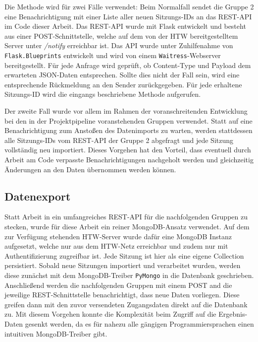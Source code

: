 Die Methode wird für zwei Fälle verwendet: 
Beim Normalfall sendet die Gruppe 2 eine Benachrichtigung mit einer Liste aller neuen Sitzungs-IDs an das REST-API im Code dieser Arbeit. 
Das REST-API wurde mit Flask entwickelt und besteht aus einer POST-Schnittstelle, welche auf dem von der HTW bereitgestelltem Server unter \textit{/notify} erreichbar ist. 
Das API wurde unter Zuhilfenahme von \texttt{Flask.Blueprints} entwickelt und wird von einem \texttt{Waitress}-Webserver bereitgestellt. 
Für jede Anfrage wird geprüft, ob Content-Type und Payload dem erwarteten JSON-Daten entsprechen. 
Sollte dies nicht der Fall sein, wird eine entsprechende Rückmeldung an den Sender zurückgegeben. 
Für jede erhaltene Sitzungs-ID wird die eingangs beschriebene Methode aufgerufen. 

Der zweite Fall wurde vor allem im Rahmen der voranschreitenden Entwicklung bei den in der Projektpipeline voranstehenden Gruppen verwendet. 
Statt auf eine Benachrichtigung zum Anstoßen des Datenimports zu warten, werden stattdessen alle Sitzungs-IDs vom REST-API der Gruppe 2 abgefragt und jede Sitzung vollständig neu importiert. 
Dieses Vorgehen hat den Vorteil, dass eventuell durch Arbeit am Code verpasste Benachrichtigungen nachgeholt werden und gleichzeitig Änderungen an den Daten übernommen werden können. 

\subsection{Datenexport}
\label{g3export}
Statt Arbeit in ein umfangreiches REST-API für die nachfolgenden Gruppen zu stecken, wurde für diese Arbeit ein reiner MongoDB-Ansatz verwendet. 
Auf dem zur Verfügung stehenden HTW-Server wurde dafür eine MongoDB Instanz aufgesetzt, welche nur aus dem HTW-Netz erreichbar und zudem nur mit Authentifizierung zugreifbar ist. 
Jede Sitzung ist hier als eine eigene Collection persistiert. 
Sobald neue Sitzungen importiert und verarbeitet wurden, werden diese zunächst mit dem MongoDB-Treiber \texttt{PyMongo} in die Datenbank geschrieben. 
Anschließend werden die nachfolgenden Gruppen mit einem POST and die jeweilige REST-Schnittstelle benachrichtigt, dass neue Daten vorliegen. 
Diese greifen dann mit den zuvor versendeten Zugangsdaten direkt auf die Datenbank zu. 
Mit diesem Vorgehen konnte die Komplexität beim Zugriff auf die Ergebnis-Daten gesenkt werden, da es für nahezu alle gängigen Programmiersprachen einen intuitiven MongoDB-Treiber gibt. 

